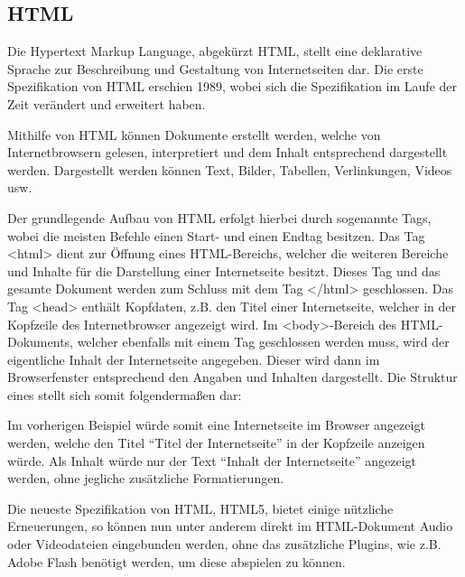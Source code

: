 \subsection{HTML}
\label{sec:Html}

Die Hypertext Markup Language, abgekürzt HTML, stellt eine deklarative Sprache zur Beschreibung und Gestaltung von Internetseiten dar. Die erste Spezifikation von HTML erschien 1989, wobei sich die Spezifikation im Laufe der Zeit verändert und erweitert haben.

Mithilfe von HTML können Dokumente erstellt werden, welche von Internetbrowsern gelesen, interpretiert und dem Inhalt entsprechend dargestellt werden. Dargestellt werden können Text, Bilder, Tabellen, Verlinkungen, Videos usw.

Der grundlegende Aufbau von HTML erfolgt hierbei durch sogenannte Tags, wobei die meisten Befehle einen Start- und einen Endtag besitzen.
Das Tag <html> dient zur Öffnung eines HTML-Bereichs, welcher die weiteren Bereiche und Inhalte für die Darstellung einer Internetseite besitzt. Dieses Tag und das gesamte Dokument werden zum Schluss mit dem Tag </html> geschlossen. Das Tag <head> enthält Kopfdaten, z.B. den Titel einer Internetseite, welcher in der Kopfzeile des Internetbrowser angezeigt wird. Im <body>-Bereich des HTML-Dokuments, welcher ebenfalls mit einem Tag geschlossen werden muss, wird der eigentliche Inhalt der Internetseite angegeben. Dieser wird dann im Browserfenster entsprechend den Angaben und Inhalten dargestellt.
Die Struktur eines stellt sich somit folgendermaßen dar:



Im vorherigen Beispiel würde somit eine Internetseite im Browser angezeigt werden, welche den Titel "`Titel der Internetseite"' in der Kopfzeile anzeigen würde. Als Inhalt würde nur der Text "`Inhalt der Internetseite"' angezeigt werden, ohne jegliche zusätzliche Formatierungen.

Die neueste Spezifikation von HTML, HTML5, bietet einige nützliche Erneuerungen, so können nun unter anderem direkt im HTML-Dokument Audio oder Videodateien eingebunden werden, ohne das zusätzliche Plugins, wie z.B. Adobe Flash benötigt werden, um diese abspielen zu können.